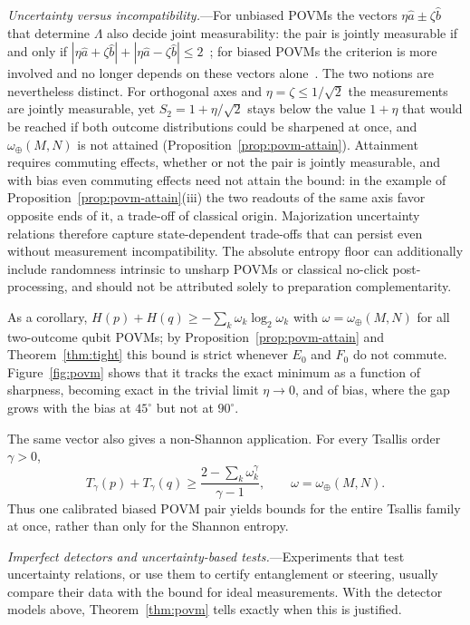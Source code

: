\documentclass[aps,pra,twocolumn,superscriptaddress,nofootinbib,floatfix]{revtex4-2}
\theoremstyle{definition}
\newcommand{\omplus}{\omega_{\oplus}}
\begin{document}
\emph{Uncertainty versus incompatibility.}---For unbiased POVMs the vectors
$\eta\hat a\pm\zeta\hat b$ that determine $\Lambda$ also decide joint
measurability: the pair is jointly measurable if and only if
$|\eta\hat a+\zeta\hat b|+|\eta\hat a-\zeta\hat b|\le2$~\cite{Busch1986,HMZ2016};
for biased POVMs the criterion is more involved and no longer depends on these
vectors alone~\cite{StanoReitznerHeinosaari2008,BuschSchmidt2010,Yu2010}.
The two notions are nevertheless distinct. For orthogonal axes and
$\eta=\zeta\le1/\sqrt2$ the measurements are jointly measurable, yet
$S_2=1+\eta/\sqrt2$ stays below the value $1+\eta$ that would be reached if both
outcome distributions could be sharpened at once, and $\omplus(M,N)$ is not
attained (Proposition~\ref{prop:povm-attain}). Attainment requires commuting
effects, whether or not the pair is jointly measurable, and with bias even
commuting effects need not attain the bound: in the example of
Proposition~\ref{prop:povm-attain}(iii) the two readouts of the same axis favor
opposite ends of it, a trade-off of classical origin. Majorization uncertainty
relations therefore capture state-dependent trade-offs that can persist even
without measurement incompatibility. The absolute entropy floor can additionally
include randomness intrinsic to unsharp POVMs or classical no-click
post-processing, and should not be attributed solely to preparation
complementarity.

As a corollary, $H(p)+H(q)\ge-\sum_k\omega_k\log_2\omega_k$ with
$\omega=\omplus(M,N)$ for all two-outcome qubit POVMs; by
Proposition~\ref{prop:povm-attain} and Theorem~\ref{thm:tight} this bound is
strict whenever $E_0$ and $F_0$ do not commute. Figure~\ref{fig:povm} shows that
it tracks the exact minimum as a function of sharpness, becoming exact in the
trivial limit $\eta\to0$, and of bias, where the gap grows with the bias at
$45^\circ$ but not at $90^\circ$.

The same vector also gives a non-Shannon application. For every Tsallis order
$\gamma>0$,
\begin{equation}
  T_\gamma(p)+T_\gamma(q)\ge
  \frac{2-\sum_k\omega_k^\gamma}{\gamma-1},
  \qquad \omega=\omplus(M,N).
  \label{eq:tsallis-povm}
\end{equation}
Thus one calibrated biased POVM pair yields bounds for the entire Tsallis family
at once, rather than only for the Shannon entropy.

\emph{Imperfect detectors and uncertainty-based tests.}---Experiments that
test uncertainty relations, or use them to certify entanglement or steering,
usually compare their data with the bound for ideal measurements. With the
detector models above, Theorem~\ref{thm:povm} tells exactly when this is
justified.
\end{document}

